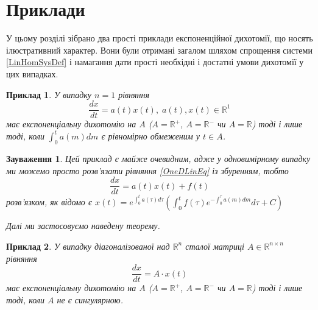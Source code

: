 \documentclass[14pt]{extarticle} %
\newtheorem{example}{\indent Приклад}[section]
\newtheorem{remark}{Зауваження}
\begin{document}
\section{Приклади}
У цьому розділі зібрано два прості приклади експоненційної дихотомії, що носять ілюстративний характер. Вони були отримані загалом шляхом
спрощення системи \ref{LinHomSysDef} і намагання дати прості необхідні і достатні умови дихотомії у цих випадках.
\begin{example}У випадку $n=1$ рівняння
	\[\frac{dx}{dt}=a(t)x(t),\; a(t),x(t)\in\mathbb{R}^1\tag{\#}\label{OneDLinEq}\]
	має експоненціальну дихотомію на $A$ ($A=\mathbb{R}^+$, $A=\mathbb{R}^-$ чи $A=\mathbb{R}$) тоді і лише тоді,
	коли $\int_0^t a(m)dm$ є рівномірно обмеженим у $t\in A$.
\end{example}
\begin{remark}
	Цей приклад є майже очевидним, адже у одновимірному випадку ми можемо просто розв’язати рівняння \ref{OneDLinEq}
	із збуренням, тобто
	\[\frac{dx}{dt}=a(t)x(t)+f(t)\]
	розв’язком, як відомо є $x(t)=e^{\int_0^ta(\tau)d\tau}(\int_0^tf(\tau)e^{-\int_0^{\tau}a(m)dm}d\tau+C)$

	Далі ми застосовуємо наведену теорему.
\end{remark}
\begin{example}У випадку діагоналізованої над $\mathbb{R}^n$ сталої матриці $A\in\mathbb{R}^{n\times n}$ рівняння
	\[\frac{dx}{dt}=A\cdot x(t)\]
	має експоненціальну дихотомію на $A$ ($A=\mathbb{R}^+$, $A=\mathbb{R}^-$ чи $A=\mathbb{R}$) тоді і лише тоді,
	коли $A$ не є сингулярною.
\end{example}
\end{document}
